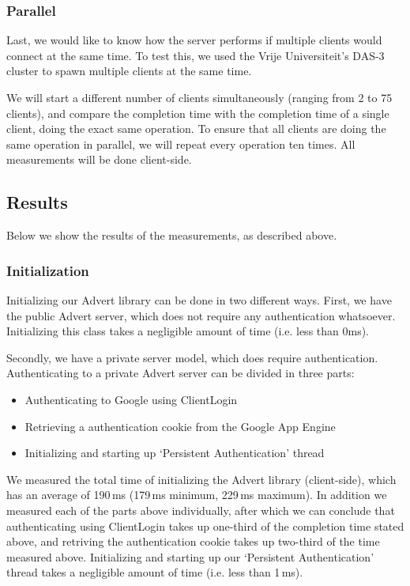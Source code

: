 \subsubsection{Parallel}
Last, we would like to know how the server performs if multiple clients would
connect at the same time. To test this, we used the Vrije Universiteit's DAS-3
cluster to spawn multiple clients at the same time. 

We will start a different number of clients simultaneously (ranging from 2 to 75
clients), and compare the completion time with the completion time of a single
client, doing the exact same operation. To ensure that all clients are doing
the same operation in parallel, we will repeat every operation ten times. All
measurements will be done client-side.

\subsection{Results}
Below we show the results of the measurements, as described above.

\subsubsection{Initialization}
Initializing our Advert library can be done in two different ways. First, we
have the public Advert server, which does not require any authentication
whatsoever. Initializing this class takes a negligible amount of time (i.e.
less than 0ms).

Secondly, we have a private server model, which does require authentication.
Authenticating to a private Advert server can be divided in three parts:

\begin{itemize}
  \item Authenticating to Google using ClientLogin
  \item Retrieving a authentication cookie from the Google App Engine
  \item Initializing and starting up `Persistent Authentication' thread
\end{itemize}

We measured the total time of initializing the Advert library (client-side),
which has an average of 190\,ms (179\,ms minimum, 229\,ms maximum). In addition
we measured each of the parts above individually, after which we can conclude
that authenticating using ClientLogin takes up one-third of the completion time
stated above, and retriving the authentication cookie takes up two-third of the
time measured above. Initializing and starting up our `Persistent Authentication'
thread takes a negligible amount of time (i.e. less than 1\,ms).

